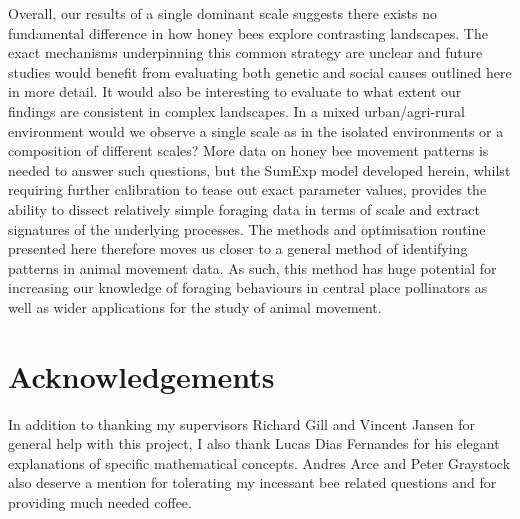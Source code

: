 \documentclass[11pt,usenames,dvipsnames,a4paper]{article}
\begin{document}
\begin{linenumbers}
Overall, our results of a single dominant scale suggests there exists no fundamental difference in how honey bees explore contrasting landscapes. The exact mechanisms underpinning this common strategy are unclear and future studies would benefit from evaluating both genetic and social causes outlined here in more detail. It would also be interesting to evaluate to what extent our findings are consistent in complex landscapes. In a mixed urban/agri-rural environment would we observe a single scale as in the isolated environments or a composition of different scales? More data on honey bee movement patterns is needed to answer such questions, but the SumExp model developed herein, whilst requiring further calibration to tease out exact parameter values, provides the ability to dissect relatively simple foraging data in terms of scale and extract signatures of the underlying processes. The methods and optimisation routine presented here therefore moves us closer to a general method of identifying patterns in animal movement data. As such, this method has huge potential for increasing our knowledge of foraging behaviours in central place pollinators as well as wider applications for the study of animal movement.
\end{linenumbers}

\section{Acknowledgements}

In addition to thanking my supervisors Richard Gill and Vincent Jansen for general help with this project, I also thank Lucas Dias Fernandes for his elegant explanations of specific mathematical concepts. Andres Arce and Peter Graystock also deserve a mention for tolerating my incessant bee related questions and for providing much needed coffee.




\end{document}
